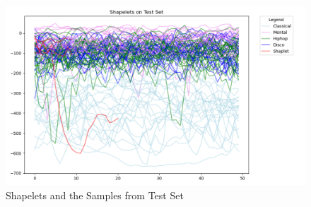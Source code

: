 \begin{figure}[H]
	\centering
	\includegraphics[width=0.9\linewidth]{../Statistical_Sciences_template/figure/Shapelets on Test Set.png}
	\caption{Shapelets and the Samples from Test Set}
	\label{fig:shapelets}
\end{figure}